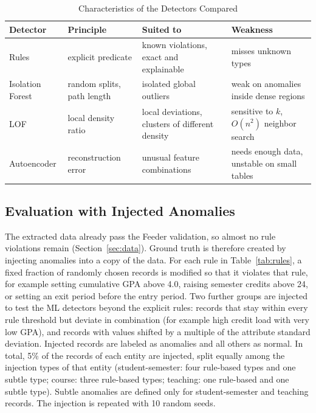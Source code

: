 \documentclass[conference]{IEEEtran}
\begin{document}
\begin{table}[htbp]
\caption{Characteristics of the Detectors Compared}
\begin{center}
\footnotesize\setlength{\tabcolsep}{3pt}
\begin{tabular}{L{0.17\columnwidth}L{0.2\columnwidth}L{0.25\columnwidth}L{0.25\columnwidth}}
\toprule
\textbf{Detector} & \textbf{Principle} & \textbf{Suited to} & \textbf{Weakness} \\
\midrule
Rules & explicit predicate & known violations, exact and explainable & misses unknown types \\
Isolation Forest & random splits, path length & isolated global outliers & weak on anomalies inside dense regions \\
LOF & local density ratio & local deviations, clusters of different density & sensitive to $k$, $O(n^2)$ neighbor search \\
Autoencoder & reconstruction error & unusual feature combinations & needs enough data, unstable on small tables \\
\bottomrule
\end{tabular}
\label{tab:detectors}
\end{center}
\end{table}

\subsection{Evaluation with Injected Anomalies}
The extracted data already pass the Feeder validation, so almost no rule violations remain (Section~\ref{sec:data}). Ground truth is therefore created by injecting anomalies into a copy of the data. For each rule in Table~\ref{tab:rules}, a fixed fraction of randomly chosen records is modified so that it violates that rule, for example setting cumulative GPA above 4.0, raising semester credits above 24, or setting an exit period before the entry period. Two further groups are injected to test the ML detectors beyond the explicit rules: records that stay within every rule threshold but deviate in combination (for example high credit load with very low GPA), and records with values shifted by a multiple of the attribute standard deviation. Injected records are labeled as anomalies and all others as normal. In total, 5\% of the records of each entity are injected, split equally among the injection types of that entity (student-semester: four rule-based types and one subtle type; course: three rule-based types; teaching: one rule-based and one subtle type). Subtle anomalies are defined only for student-semester and teaching records. The injection is repeated with 10 random seeds.
\end{document}
